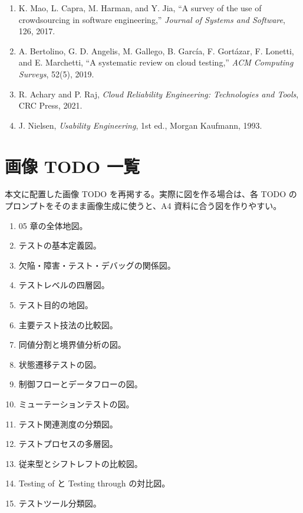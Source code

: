 \documentclass[uplatex,dvipdfmx,a4paper,11pt,nomag]{jsarticle}
\begin{document}
\begin{enumerate}[leftmargin=2.2em]
\item K. Mao, L. Capra, M. Harman, and Y. Jia, ``A survey of the use of crowdsourcing in software engineering,'' \textit{Journal of Systems and Software}, 126, 2017.
\item A. Bertolino, G. D. Angelis, M. Gallego, B. García, F. Gortázar, F. Lonetti, and E. Marchetti, ``A systematic review on cloud testing,'' \textit{ACM Computing Surveys}, 52(5), 2019.
\item R. Achary and P. Raj, \textit{Cloud Reliability Engineering: Technologies and Tools}, CRC Press, 2021.
\item J. Nielsen, \textit{Usability Engineering}, 1st ed., Morgan Kaufmann, 1993.
\end{enumerate}

\section{画像 TODO 一覧}
本文に配置した画像 TODO を再掲する。実際に図を作る場合は、各 TODO のプロンプトをそのまま画像生成に使うと、A4 資料に合う図を作りやすい。

\begin{enumerate}[leftmargin=2em]
\item 05 章の全体地図。
\item テストの基本定義図。
\item 欠陥・障害・テスト・デバッグの関係図。
\item テストレベルの四層図。
\item テスト目的の地図。
\item 主要テスト技法の比較図。
\item 同値分割と境界値分析の図。
\item 状態遷移テストの図。
\item 制御フローとデータフローの図。
\item ミューテーションテストの図。
\item テスト関連測度の分類図。
\item テストプロセスの多層図。
\item 従来型とシフトレフトの比較図。
\item Testing of と Testing through の対比図。
\item テストツール分類図。
\end{enumerate}
\end{document}
